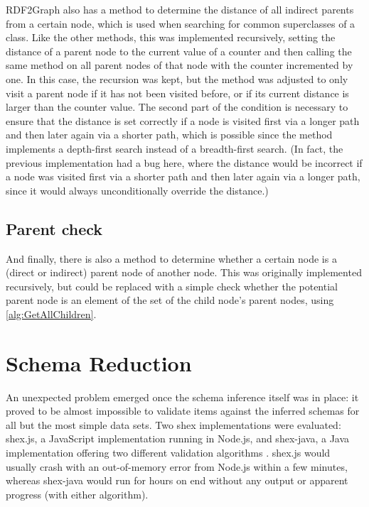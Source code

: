 \Gls{RDF2Graph} also has a method to determine the distance of all indirect parents from a certain node,
which is used when searching for common superclasses of a class.
Like the other methods, this was implemented recursively,
setting the distance of a parent node to the current value of a counter
and then calling the same method on all parent nodes of that node with the counter incremented by one.
In this case, the recursion was kept,
but the method was adjusted to only visit a parent node
if it has not been visited before, or if its current distance is larger than the counter value.
The second part of the condition is necessary to ensure that the distance is set correctly
if a node is visited first via a longer path and then later again via a shorter path,
which is possible since the method implements a depth-first search instead of a breadth-first search.
(In fact, the previous implementation had a bug here,
where the distance would be incorrect if a node was visited first via a shorter path and then later again via a longer path,
since it would always unconditionally override the distance.)

\subsection{Parent check}
\label{subsec:RDF2Graph+Wikidata:cyclic-graph:IsParent}

And finally, there is also a method to determine whether a certain node is a (direct or indirect) parent node of another node.
This was originally implemented recursively,
but could be replaced with a simple check whether the potential parent node is an element of the set of the child node’s parent nodes,
using \cref{alg:GetAllChildren}.

\section{Schema Reduction}
\label{sec:RDF2Graph+Wikidata:schema-reduction}

An unexpected problem emerged once the \gls{schema} inference itself was in place: %
it proved to be almost impossible to validate \glspl{item} against the inferred schemas
for all but the most simple data sets.
Two \gls{shex} implementations were evaluated:
shex.js, %
a \gls{JavaScript} implementation running in \gls{Node.js},
and shex-java,
a Java implementation offering two different validation algorithms \cite{boneva:hal-01590350}.
shex.js would usually crash with an out-of-memory error from \gls{Node.js} within a few minutes,
whereas shex-java would run for hours on end without any output or apparent progress
(with either algorithm).

